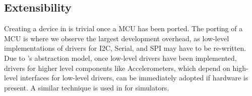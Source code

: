 \subsection{Extensibility}

Creating a device in \CO is trivial once a MCU has been ported. The porting of a MCU is where we observe the largest development overhead, as low-level implementations of drivers for I2C, Serial, and SPI may have to be re-written. Due to \CON's abstraction model, once low-level drivers have been implemented, drivers for higher level components like Accelerometers, which depend on high-level interfaces for low-level drivers, can be immediately adopted if hardware is present. A similar technique is used in \MC for simulators.






